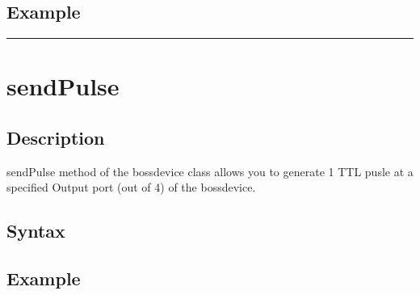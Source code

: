 \documentclass[letterpaper,10pt,english]{sphinxmanual}
\begin{document}
\subsection{Example}
\label{\detokenize{4_api_documentation:example}}
\begin{sphinxVerbatim}[commandchars=\\\{\}]
\end{sphinxVerbatim}


\bigskip\hrule\bigskip



\section{sendPulse}
\label{\detokenize{4_api_documentation:sendpulse}}

\subsection{Description}
\label{\detokenize{4_api_documentation:id1}}
\sphinxAtStartPar
sendPulse method of the bossdevice class allows you to generate 1 TTL pusle at a specified Output port (out of 4) of the bossdevice.


\subsection{Syntax}
\label{\detokenize{4_api_documentation:id2}}
\begin{sphinxVerbatim}[commandchars=\\\{\}]
\PYG{p}{[}\PYG{p}{]}
\end{sphinxVerbatim}


\subsection{Example}
\label{\detokenize{4_api_documentation:id3}}
\begin{sphinxVerbatim}[commandchars=\\\{\}]
\end{sphinxVerbatim}
\end{document}
